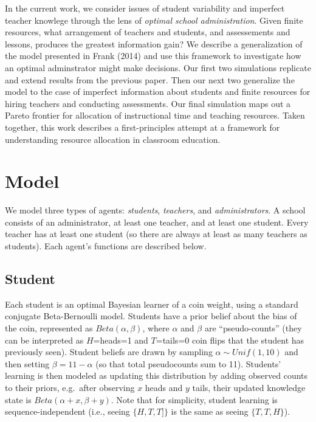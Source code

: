 \documentclass[10pt, letterpaper]{article}
\begin{document}
In the current work, we consider issues of student variability and
imperfect teacher knowlege through the lens of \emph{optimal school
administration}. Given finite resources, what arrangement of teachers
and students, and assessements and lessons, produces the greatest
information gain? We describe a generalization of the model presented in
Frank (2014) and use this framework to investigate how an optimal
adminstrator might make decisions. Our first two simulations replicate
and extend results from the previous paper. Then our next two generalize
the model to the case of imperfect information about students and finite
resources for hiring teachers and conducting assessments. Our final
simulation maps out a Pareto frontier for allocation of instructional
time and teaching resources. Taken together, this work describes a
first-principles attempt at a framework for understanding resource
allocation in classroom education.

\section{Model}\label{model}

We model three types of agents: \emph{students}, \emph{teachers}, and
\emph{administrators}. A school consists of an administrator, at least
one teacher, and at least one student. Every teacher has at least one
student (so there are always at least as many teachers as students).
Each agent's functions are described below.

\subsection{Student}\label{student}

Each student is an optimal Bayesian learner of a coin weight, using a
standard conjugate Beta-Bernoulli model. Students have a prior belief
about the bias of the coin, represented as \(Beta(\alpha,\beta)\), where
\(\alpha\) and \(\beta\) are ``pseudo-counts'' (they can be interpreted
as \(H\)=heads=1 and \(T\)=tails=0 coin flips that the student has
previously seen). Student beliefs are drawn by sampling
\(\alpha \sim Unif(1,10)\) and then setting \(\beta = 11 - \alpha\) (so
that total pseudocounts sum to 11). Students' learning is then modeled
as updating this distribution by adding observed counts to their priors,
e.g.~after observing \(x\) heads and \(y\) tails, their updated
knowledge state is \(Beta(\alpha + x, \beta + y)\). Note that for
simplicity, student learning is sequence-independent (i.e., seeing
\(\{H, T, T]\}\) is the same as seeing \(\{T, T, H\}\)).
\end{document}
